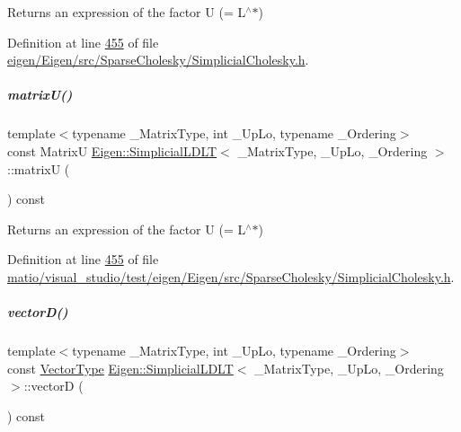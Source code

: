 \begin{DoxyReturn}{Returns}
an expression of the factor U (= L$^\wedge$$\ast$) 
\end{DoxyReturn}


Definition at line \hyperlink{eigen_2_eigen_2src_2_sparse_cholesky_2_simplicial_cholesky_8h_source_l00455}{455} of file \hyperlink{eigen_2_eigen_2src_2_sparse_cholesky_2_simplicial_cholesky_8h_source}{eigen/\+Eigen/src/\+Sparse\+Cholesky/\+Simplicial\+Cholesky.\+h}.

\mbox{\label{group___sparse_cholesky___module_ae98ed1c7ce8f9165adf5fb08cbb36b70}} 
\subparagraph{\texorpdfstring{matrix\+U()}{matrixU()}\hspace{0.1cm}{\footnotesize\ttfamily [2/2]}}
{\footnotesize\ttfamily template$<$typename \+\_\+\+Matrix\+Type, int \+\_\+\+Up\+Lo, typename \+\_\+\+Ordering$>$ \\
const MatrixU \hyperlink{group___sparse_cholesky___module_class_eigen_1_1_simplicial_l_d_l_t}{Eigen\+::\+Simplicial\+L\+D\+LT}$<$ \+\_\+\+Matrix\+Type, \+\_\+\+Up\+Lo, \+\_\+\+Ordering $>$\+::matrixU (\begin{DoxyParamCaption}{ }\end{DoxyParamCaption}) const\hspace{0.3cm}{\ttfamily [inline]}}

\begin{DoxyReturn}{Returns}
an expression of the factor U (= L$^\wedge$$\ast$) 
\end{DoxyReturn}


Definition at line \hyperlink{matio_2visual__studio_2test_2eigen_2_eigen_2src_2_sparse_cholesky_2_simplicial_cholesky_8h_source_l00455}{455} of file \hyperlink{matio_2visual__studio_2test_2eigen_2_eigen_2src_2_sparse_cholesky_2_simplicial_cholesky_8h_source}{matio/visual\+\_\+studio/test/eigen/\+Eigen/src/\+Sparse\+Cholesky/\+Simplicial\+Cholesky.\+h}.

\mbox{\label{group___sparse_cholesky___module_abe54532ce80558a0474b11763702107b}} 
\subparagraph{\texorpdfstring{vector\+D()}{vectorD()}\hspace{0.1cm}{\footnotesize\ttfamily [1/2]}}
{\footnotesize\ttfamily template$<$typename \+\_\+\+Matrix\+Type, int \+\_\+\+Up\+Lo, typename \+\_\+\+Ordering$>$ \\
const \hyperlink{group___core___module}{Vector\+Type} \hyperlink{group___sparse_cholesky___module_class_eigen_1_1_simplicial_l_d_l_t}{Eigen\+::\+Simplicial\+L\+D\+LT}$<$ \+\_\+\+Matrix\+Type, \+\_\+\+Up\+Lo, \+\_\+\+Ordering $>$\+::vectorD (\begin{DoxyParamCaption}{ }\end{DoxyParamCaption}) const\hspace{0.3cm}{\ttfamily [inline]}}

